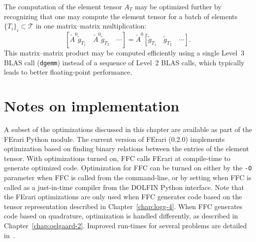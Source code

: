 The computation of the element tensor $A_T$ may be optimized further
by recognizing that one may compute the element tensor for a batch of
elements $\{T_i\}_i \subset \mathcal{T}$ in one matrix--matrix
multiplication:
\begin{equation}
  \left[\tilde{A}^0 \tilde{g}_{T_1} \quad \tilde{A}^0 \tilde{g}_{T_2} \quad \cdots \right] =
  \tilde{A}^0 \left[\tilde{g}_{T_1} \quad \tilde{g}_{T_2} \quad \cdots\right].
\end{equation}
This matrix--matrix product may be computed efficiently using a single
Level~3 BLAS call (\texttt{dgemm}) instead of a sequence of Level~2
BLAS calls, which typically leads to better floating-point
performance.

\section{Notes on implementation}

A subset of the optimizations discussed in this chapter are available
as part of the FErari Python module. The current version of FErari
(0.2.0) implements optimization based on finding binary relations
between the entries of the element tensor. With optimizations turned
on, FFC calls FErari at compile-time to generate optimized
code. Optimization for FFC can be turned on either by the \texttt{-O}
parameter when FFC is called from the command-line, or by setting
 when FFC is
called as a just-in-time compiler from the DOLFIN Python
interface. Note that the FErari optimizations are only used when FFC
generates code based on the tensor representation described in
Chapter~\ref{chap:logg-4}. When FFC generates code based on
quadrature, optimization is handled differently, as described in
Chapter~\ref{chap:oelgaard-2}.  Improved run-times for several
problems are detailed in~\cite{KirbyLogg2008}.
